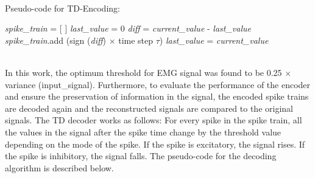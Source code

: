\documentclass[journal,article,submit,moreauthors,pdftex,10pt,a4paper]{Definitions/mdpi}
\begin{document}
\ \\
Pseudo-code for TD-Encoding:
\begin{algorithmic}[1]
\STATE \textit{spike\_train} = [ ]
\vspace{0.2cm}
\STATE \textit{last\_value} = 0
\vspace{0.2cm}
\vspace{0.1cm}
\STATE \textit{diff} = \textit{current\_value} - \textit{last\_value}
\vspace{0.2cm}
\vspace{0.2cm}
\STATE \textit{spike\_train}.add (sign (\textit{diff}) $\times$ time step $\tau$)
\vspace{0.2cm}
\ENDIF
\vspace{0.2cm}
\STATE \textit{last\_value} = \textit{current\_value}
\vspace{0.2cm}
\ENDFOR
\end{algorithmic}
\\
In this work, the optimum threshold for EMG signal was found to be 0.25  $\times$ variance (input\_signal). Furthermore, to evaluate the performance of the encoder and ensure the preservation of information in the signal, the encoded spike trains are decoded again and the reconstructed signals are compared to the original signals. The TD decoder works as follows: For every spike in the spike train, all the values in the signal after the spike time change by the threshold value depending on the mode of the spike. If the spike is excitatory, the signal rises. If the spike is inhibitory, the signal falls. The pseudo-code for the decoding algorithm  is described below. 
\end{document}
